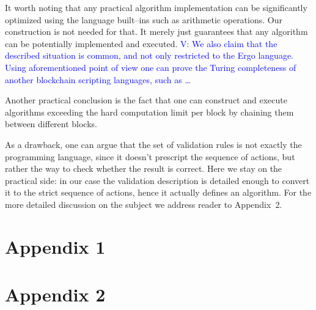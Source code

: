 \documentclass[runningheads]{llncs}
\newcommand{\vk}[1]{\textcolor{blue}{V: {#1}}}
\begin{document}
    It worth noting that any practical algorithm implementation can be
    significantly optimized using the language built--ins such as arithmetic
    operations. Our construction is not needed for that. It merely just
    guarantees that any algorithm can be potentially implemented and executed.
    \vk{We also claim that the described situation is common, and not only
    restricted to the Ergo language. Using aforementioned point of view one
    can prove the Turing completeness of another blockchain scripting
    languages, such as \ldots}

    Another practical conclusion is the fact that one can construct and execute
    algorithms exceeding the hard computation limit per block by chaining them
    between different blocks.

    As a drawback, one can argue that the set of validation rules is not exactly
    the programming language, since it doesn't prescript the sequence of actions,
    but rather the way to check whether the result is correct. Here we stay on the
    practical side: in our case the validation description is detailed enough to
    convert it to the strict sequence of actions, hence it actually defines an
    algorithm. For the more detailed discussion on the subject we address reader
    to Appendix~2.

    

    \section{Appendix 1}
    \label{appendix1}

    \section{Appendix 2}
    \label{appendix2}

\end{document}

